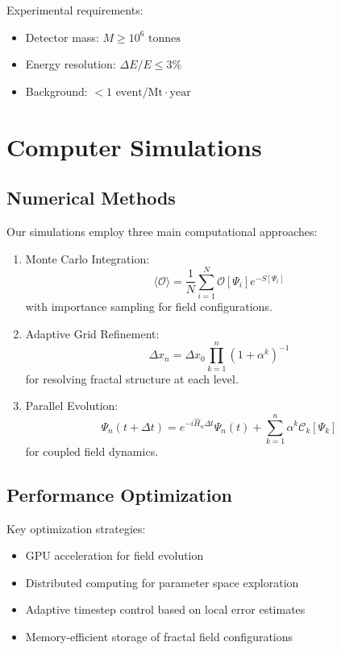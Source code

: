 \documentclass[12pt]{article}
\begin{document}
Experimental requirements:

\begin{itemize}
\item Detector mass: $M \geq 10^6 \text{ tonnes}$
\item Energy resolution: $\Delta E/E \leq 3\%$
\item Background: $< 1 \text{ event/Mt}\cdot\text{year}$
\end{itemize}

\section{Computer Simulations}
\label{app:simulations}

\subsection{Numerical Methods}

Our simulations employ three main computational approaches:

\begin{enumerate}
\item Monte Carlo Integration:
   \begin{equation}
   \langle\mathcal{O}\rangle = \frac{1}{N}\sum_{i=1}^N \mathcal{O}[\Psi_i] e^{-S[\Psi_i]}
   \end{equation}
   with importance sampling for field configurations.

\item Adaptive Grid Refinement:
   \begin{equation}
   \Delta x_n = \Delta x_0 \prod_{k=1}^n (1 + \alpha^k)^{-1}
   \end{equation}
   for resolving fractal structure at each level.

\item Parallel Evolution:
   \begin{equation}
   \Psi_n(t + \Delta t) = e^{-i\hat{H}_n\Delta t}\Psi_n(t) + \sum_{k=1}^n \alpha^k \mathcal{C}_k[\Psi_k]
   \end{equation}
   for coupled field dynamics.
\end{enumerate}

\subsection{Performance Optimization}

Key optimization strategies:

\begin{itemize}
\item GPU acceleration for field evolution
\item Distributed computing for parameter space exploration
\item Adaptive timestep control based on local error estimates
\item Memory-efficient storage of fractal field configurations
\end{itemize}
\end{document}
